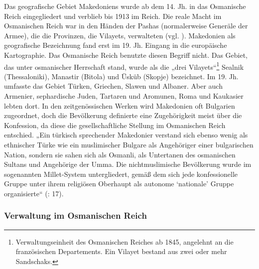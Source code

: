 Das geografische Gebiet Makedoniens wurde ab dem 14. Jh. in das Osmanische Reich eingegliedert und verblieb bis 1913 im Reich. Die reale Macht im Osmanischen Reich war in den Händen der Pashas (normalerweise Generäle der Armee), die die Provinzen, die Vilayets, verwalteten (vgl. \cite{toepfer}). Makedonien als geografische Bezeichnung fand erst im 19. Jh. Eingang in die europäische Kartographie. Das Osmanische Reich benutzte diesen Begriff nicht. Das Gebiet, das unter osmanischer Herrschaft stand, wurde als die „drei Vilayets“\footnote{Verwaltungseinheit des Osmanischen Reiches ab 1845, angelehnt an die französischen Departements. Ein Vilayet bestand aus zwei oder mehr Sandschaks.} Sealnik (Thessaloniki), Manastir (Bitola) und Üsküb (Skopje) bezeichnet. Im 19. Jh. umfasste das Gebiet Türken, Griechen, Slawen und Albaner. Aber auch Armenier, sephardische Juden, Tartaren und Aromunen, Roma und Kaukasier lebten dort. In den zeitgenössischen Werken wird Makedonien oft Bulgarien zugeordnet, doch die Bevölkerung definierte eine Zugehörigkeit meist über die Konfession, da diese die gesellschaftliche Stellung im Osmanischen Reich entschied. „Ein türkisch sprechender Makedonier verstand sich ebenso wenig als ethnischer Türke wie ein muslimischer Bulgare als Angehöriger einer bulgarischen Nation, sondern sie sahen sich als Osmanli, als Untertanen des osmanischen Sultans und Angehörige der Umma. Die nichtmuslimische Bevölkerung wurde im sogenannten Millet-System untergliedert, gemäß dem sich jede konfessionelle Gruppe unter ihrem religiösen Oberhaupt als autonome ‘nationale’ Gruppe organisierte“ (\cite{opfer}: 17).

\subsubsection{Verwaltung im Osmanischen Reich}

